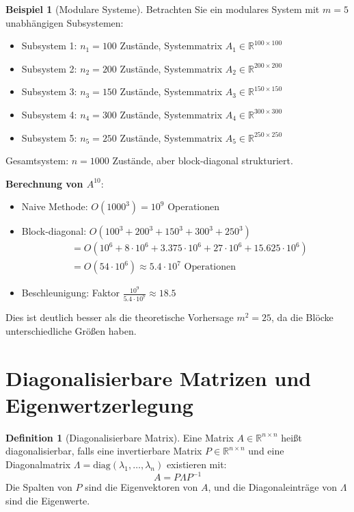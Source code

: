 \documentclass[a4paper,12pt]{report}
\theoremstyle{definition}
\newtheorem{definition}{Definition}
\newtheorem{beispiel}{Beispiel}
\begin{document}
	\begin{beispiel}[Modulare Systeme]
		Betrachten Sie ein modulares System mit $m = 5$ unabhängigen Subsystemen:
		\begin{itemize}
			\item Subsystem 1: $n_1 = 100$ Zustände, Systemmatrix $A_1 \in \mathbb{R}^{100 \times 100}$
			\item Subsystem 2: $n_2 = 200$ Zustände, Systemmatrix $A_2 \in \mathbb{R}^{200 \times 200}$
			\item Subsystem 3: $n_3 = 150$ Zustände, Systemmatrix $A_3 \in \mathbb{R}^{150 \times 150}$
			\item Subsystem 4: $n_4 = 300$ Zustände, Systemmatrix $A_4 \in \mathbb{R}^{300 \times 300}$
			\item Subsystem 5: $n_5 = 250$ Zustände, Systemmatrix $A_5 \in \mathbb{R}^{250 \times 250}$
		\end{itemize}
		
		Gesamtsystem: $n = 1000$ Zustände, aber block-diagonal strukturiert.
		
		\textbf{Berechnung von $A^{10}$}:
		\begin{itemize}
			\item Naive Methode: $O(1000^3) = 10^9$ Operationen
			\item Block-diagonal: $O(100^3 + 200^3 + 150^3 + 300^3 + 250^3)$
			\begin{align}
				&= O(10^6 + 8 \cdot 10^6 + 3.375 \cdot 10^6 + 27 \cdot 10^6 + 15.625 \cdot 10^6) \\
				&= O(54 \cdot 10^6) \approx 5.4 \cdot 10^7 \text{ Operationen}
			\end{align}
			\item Beschleunigung: Faktor $\frac{10^9}{5.4 \cdot 10^7} \approx 18.5$
		\end{itemize}
		
		Dies ist deutlich besser als die theoretische Vorhersage $m^2 = 25$, da die Blöcke unterschiedliche Größen haben.
	\end{beispiel}
	
	\section{Diagonalisierbare Matrizen und Eigenwertzerlegung}
	
	\begin{definition}[Diagonalisierbare Matrix]
		Eine Matrix $A \in \mathbb{R}^{n \times n}$ heißt diagonalisierbar, falls eine invertierbare Matrix $P \in \mathbb{R}^{n \times n}$ und eine Diagonalmatrix $\Lambda = \text{diag}(\lambda_1, \ldots, \lambda_n)$ existieren mit:
		\[
		A = P \Lambda P^{-1}
		\]
		Die Spalten von $P$ sind die Eigenvektoren von $A$, und die Diagonaleinträge von $\Lambda$ sind die Eigenwerte.
	\end{definition}
	
\end{document}
